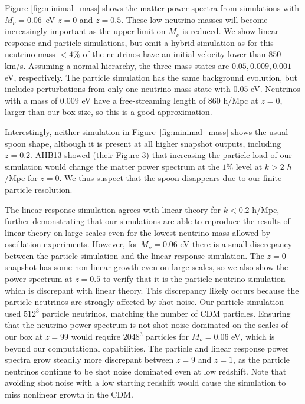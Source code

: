 \documentclass[useAMS, usenatbib]{mnras}
\begin{document}
Figure \ref{fig:minimal_mass} shows the matter power spectra from simulations with $M_\nu = 0.06$~eV $z=0$ and $z=0.5$. These low neutrino masses will become increasingly important as the upper limit on $M_\nu$ is reduced. We show linear response and particle simulations, but omit a hybrid simulation as for this neutrino mass $ < 4\%$ of the neutrinos have an initial velocity lower than $850$ km/s. Assuming a normal hierarchy, the three mass states are $0.05, 0.009, 0.001$ eV, respectively. The particle simulation has the same background evolution, but includes perturbations from only one neutrino mass state with $0.05$ eV. Neutrinos with a mass of $0.009$ eV have a free-streaming length of $860$ h/Mpc at $z=0$, larger than our box size, so this is a good approximation.

Interestingly, neither simulation in Figure~\ref{fig:minimal_mass} shows the usual spoon shape, although it is present at all higher snapshot outputs, including $z=0.2$. AHB13 showed (their Figure 3) that increasing the particle load of our simulation would change the matter power spectrum at the $1\%$ level at $k > 2$ $h$/Mpc for $z=0$. We thus suspect that the spoon disappears due to our finite particle resolution.

The linear response simulation agrees with linear theory for $k < 0.2$ h/Mpc, further demonstrating that our simulations are able to reproduce the results of linear theory on large scales even for the lowest neutrino mass allowed by oscillation experiments. However, for $M_\nu = 0.06$ eV there is a small discrepancy between the particle simulation and the linear response simulation. The $z=0$ snapshot has some non-linear growth even on large scales, so we also show the power spectrum at $z=0.5$ to verify that it is the particle neutrino simulation which is discrepant with linear theory. This discrepancy likely occurs because the particle neutrinos are strongly affected by shot noise. Our particle simulation used $512^3$ particle neutrinos, matching the number of CDM particles. Ensuring that the neutrino power spectrum is not shot noise dominated on the scales of our box at $z=99$ would require $2048^3$ particles for $M_\nu = 0.06$ eV, which is beyond our computational capabilities. The particle and linear response power spectra grow steadily more discrepant between $z=9$ and $z=1$, as the particle neutrinos continue to be shot noise dominated even at low redshift. Note that avoiding shot noise with a low starting redshift would cause the simulation to miss nonlinear growth in the CDM.
\end{document}

